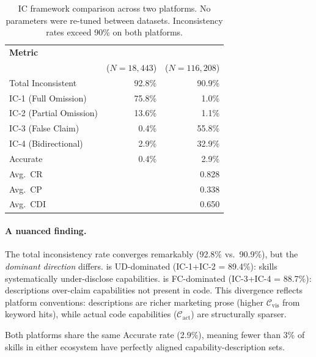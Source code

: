 \begin{table}[h]
\centering
\caption{IC framework comparison across two platforms.
  No parameters were re-tuned between datasets.
  Inconsistency rates exceed 90\% on both platforms.}
\label{tab:crossplatform}
\small
\begin{tabular}{@{}lrr@{}}
\toprule
\textbf{Metric} & \textbf{\clawhub{}} & \textbf{\skillssh{}} \\
                & \small($N{=}18{,}443$) & \small($N{=}116{,}208$) \\
\midrule
Total Inconsistent         & 92.8\%  & 90.9\%  \\
IC-1 (Full Omission)       & 75.8\%  &  1.0\%  \\
IC-2 (Partial Omission)    & 13.6\%  &  1.1\%  \\
IC-3 (False Claim)         &  0.4\%  & 55.8\%  \\
IC-4 (Bidirectional)       &  2.9\%  & 32.9\%  \\
Accurate                   &  0.4\%  &  2.9\%  \\
\midrule
Avg.\ CR                   & \ResultCR{} & 0.828   \\
Avg.\ CP                   & \ResultCP{} & 0.338   \\
Avg.\ CDI                  & \ResultCDI{} & 0.650   \\
\bottomrule
\end{tabular}
\end{table}

\paragraph{A nuanced finding.}
The total inconsistency rate converges remarkably
(92.8\% vs.\ 90.9\%), but the \emph{dominant direction}
differs.
\clawhub{} is UD-dominated (IC-1+IC-2 = 89.4\%):
skills systematically under-disclose capabilities.
\skillssh{} is FC-dominated (IC-3+IC-4 = 88.7\%):
descriptions over-claim capabilities not present in code.
This divergence reflects platform conventions:
\skillssh{} descriptions are richer marketing prose
(higher $\mathcal{C}_{\text{vis}}$ from keyword hits),
while actual code capabilities ($\mathcal{C}_{\text{act}}$)
are structurally sparser.

Both platforms share the same Accurate rate (2.9\%),
meaning fewer than 3\% of skills in either ecosystem
have perfectly aligned capability-description sets.

